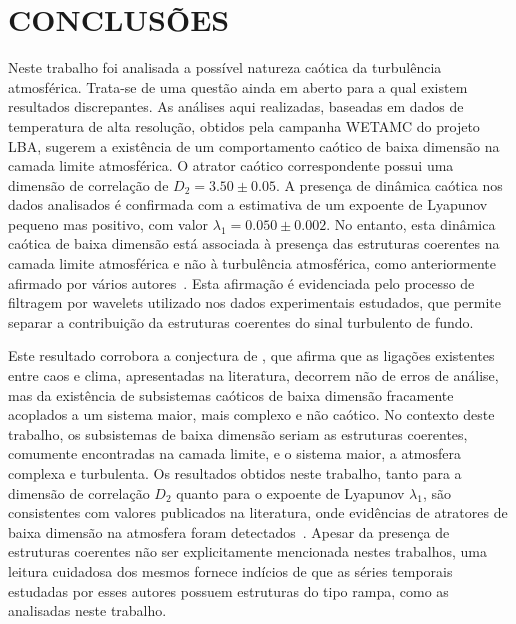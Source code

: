 
\chapter{CONCLUSÕES}


Neste trabalho foi analisada a possível natureza caótica da turbulência atmosférica. Trata-se de uma questão ainda em aberto para a qual existem resultados discrepantes. As análises aqui realizadas, baseadas em dados de temperatura de alta resolução, obtidos pela campanha WETAMC do projeto LBA, sugerem a existência de um comportamento caótico de baixa dimensão na camada limite atmosférica. O atrator caótico correspondente possui uma dimensão de correlação de $D_{2}=3.50\pm0.05$. A presença de dinâmica caótica nos dados analisados é confirmada com a estimativa de um expoente de Lyapunov pequeno mas positivo, com valor $\lambda_{1}=0.050\pm0.002$. No entanto, esta dinâmica caótica de baixa dimensão está associada à presença das estruturas coerentes na camada limite atmosférica e não à turbulência atmosférica, como anteriormente afirmado por vários autores~\cite{xin/01,jaramillo/93,gallego/01}. Esta afirmação é evidenciada pelo processo de filtragem por wavelets utilizado nos dados experimentais estudados, que permite separar a contribuição da estruturas coerentes do sinal turbulento de fundo.

Este resultado corrobora a conjectura de , que afirma que as ligações existentes entre caos e clima, apresentadas na literatura, decorrem não de erros de análise, mas da existência de subsistemas caóticos de baixa dimensão fracamente acoplados a um sistema maior, mais complexo e não caótico. No contexto deste trabalho, os subsistemas de baixa dimensão seriam as estruturas coerentes, comumente encontradas na camada limite, e o sistema maior, a atmosfera complexa e turbulenta. Os resultados obtidos neste trabalho, tanto para a dimensão de correlação $D_{2}$ quanto para o expoente de Lyapunov $\lambda_{1}$, são consistentes com valores publicados na literatura, onde evidências de atratores de baixa dimensão na atmosfera foram detectados~\cite{xin/01,jaramillo/93,gallego/01}. Apesar da presença de estruturas coerentes não ser explicitamente mencionada nestes trabalhos, uma leitura cuidadosa dos mesmos fornece indícios de que as séries temporais estudadas por esses autores possuem estruturas do tipo rampa, como as analisadas neste trabalho.
 
